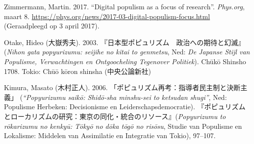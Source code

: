 \documentclass[10.5pt,dutch,]{article}
\begin{document}
\hypertarget{ref-zimmermannux5fdigitalux5f2017}{}
Zimmermann, Martin. 2017. “Digital populism as a focus of research”. \emph{Phys.org}, maart 8. \url{https://phys.org/news/2017-03-digital-populism-focus.html} (Geraadpleegd op 3 april 2017).

\hypertarget{ref-otakeux5fnihonux5f2003}{}
Otake, Hideo (大嶽秀夫). 2003. 『日本型ポピュリズム　政治への期待と幻滅』(\emph{Nihon gata popyurizumu: seijihe no kitai to genmetsu}, Ned: \emph{ De Japanse Stijl van Populisme,  Verwachtingen en Ontgoocheling Tegenover Politiek}). Chūkō Shinsho 1708. Tokio: Chūō kōron shinsha (中央公論新社)

\hypertarget{ref-kimuraux5fpopyurizumuux5f2006}{}
Kimura, Masato (木村正人). 2006. 「ポピュリズム再考：指導者民主制と決断主義」 (\emph{“Popyurizumu saikō: Shidō-sha minshu-sei to ketsudan shugi”}, Ned: Populisme Herbeken: Decisionisme en Leiderschapsdemocratie).  『ポピュリズムとローカリズムの研究：東京の同化・統合のリソース』(\emph{Popyurizumu to rōkarizumu no kenkyū: Tōkyō no dōka tōgō no risōsu}, Studie van Populisme en Lokalisme: Middelen van Assimilatie en Integratie van Tokio), 97–107.


\end{document}
